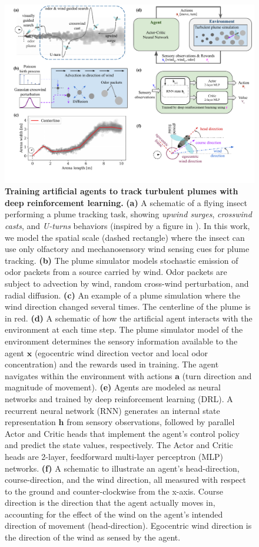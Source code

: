 \documentclass[5p,twocolumn,authoryear]{elsarticle}
\begin{document}
\begin{figure}[h!]
\centering
\includegraphics[width=1.0\linewidth]{fig_training.pdf}
\caption{
\textbf{Training artificial agents to track turbulent plumes with deep reinforcement learning.}
    \textbf{(a)} 
    A schematic of a flying insect performing a plume tracking task, showing \textit{upwind surges}, \textit{crosswind casts}, and \textit{U-turns} behaviors (inspired by a figure in \cite{baker2018algorithms}).
    In this work, we model the spatial scale (dashed rectangle) where the insect can use only olfactory and mechanosensory wind sensing cues for plume tracking.
    \textbf{(b)} 
    The plume simulator models stochastic emission of odor packets from a source carried by wind. 
    Odor packets are subject to advection by wind, random cross-wind perturbation, and radial diffusion.
    \textbf{(c)}
    An example of a plume simulation where the wind direction changed several times.
    The centerline of the plume is in red.
    \textbf{(d)} 
    A schematic of how the artificial agent interacts with the environment at each time step. 
    The plume simulator model of the environment determines the sensory information available to the agent $\mathbf{x}$ (egocentric wind direction vector and local odor concentration) and the rewards used in training.
    The agent navigates within the environment with actions $\mathbf{a}$ (turn direction and magnitude of movement).
    \textbf{(e)} Agents are modeled as neural networks and trained by deep reinforcement learning (DRL). 
    A recurrent neural network (RNN) generates an internal state representation $\mathbf{h}$ from sensory observations, followed by parallel Actor and Critic heads that implement the agent's control policy and predict the state values, respectively.
    The Actor and Critic heads are 2-layer, feedforward multi-layer perceptron (MLP) networks.
    \textbf{(f)} 
    A schematic to illustrate an agent's head-direction, course-direction, and the wind direction, all measured with respect to the ground and counter-clockwise from the x-axis.
    Course direction is the direction that the agent actually moves in, accounting for the effect of the wind on the agent's intended direction of movement (head-direction).
    Egocentric wind direction is the direction of the wind as sensed by the agent. 
    }
\label{fig_training}
\end{figure}
\end{document}
